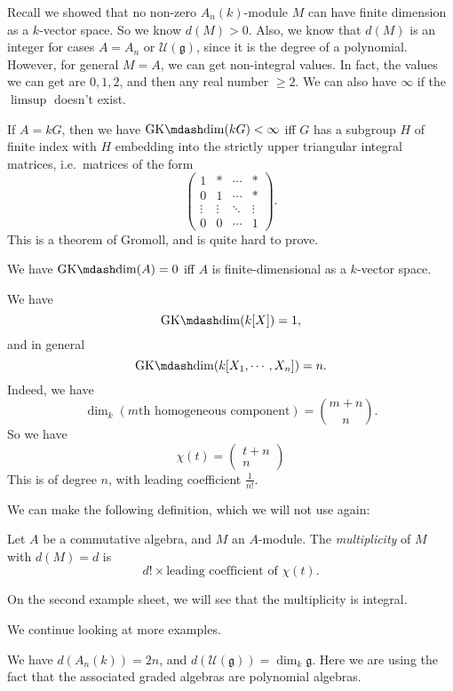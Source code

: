 \documentclass[a4paper]{article}
\newcommand\GKdim{\mathrm{GK}\mdash\mathrm{dim}}
\begin{document}
Recall we showed that no non-zero $A_n(k)$-module $M$ can have finite dimension as a $k$-vector space. So we know $d(M) > 0$. Also, we know that $d(M)$ is an integer for cases $A = A_n$ or $\mathcal{U}(\mathfrak{g})$, since it is the degree of a polynomial. However, for general $M = A$, we can get non-integral values. In fact, the values we can get are $0, 1, 2$, and then any real number $\geq 2$. We can also have $\infty$ if the $\limsup$ doesn't exist.

\begin{eg}
  If $A = kG$, then we have $\GKdim(kG) < \infty$ iff $G$ has a subgroup $H$ of finite index with $H$ embedding into the strictly upper triangular integral matrices, i.e.\ matrices of the form
  \[
    \begin{pmatrix}
      1 & * & \cdots & *\\
      0 & 1 & \cdots & *\\
      \vdots & \vdots & \ddots & \vdots\\
      0 & 0 & \cdots & 1
    \end{pmatrix}.
  \]
  This is a theorem of Gromoll, and is quite hard to prove.
\end{eg}

\begin{eg}
  We have $\GKdim(A)= 0$ iff $A$ is finite-dimensional as a $k$-vector space.

  We have
  \[
    \GKdim(k[X]) = 1,
  \]
  and in general
  \[
    \GKdim(k[X_1, \cdots, X_n]) = n.
  \]
  Indeed, we have
  \[
    \dim_k(\text{$m$th homogeneous component}) = \binom{m + n}{n}.
  \]
  So we have
  \[
    \chi(t) =
    \begin{pmatrix}
      t + n\\n
    \end{pmatrix}
  \]
  This is of degree $n$, with leading coefficient $\frac{1}{n!}$.
\end{eg}

We can make the following definition, which we will not use again:
\begin{defi}[Multiplicity]
  Let $A$ be a commutative algebra, and $M$ an $A$-module. The \emph{multiplicity} of $M$ with $d(M) = d$ is
  \[
    d! \times \text{leading coefficient of $\chi(t)$}.
  \]
\end{defi}
On the second example sheet, we will see that the multiplicity is integral.

We continue looking at more examples.
\begin{eg}
  We have $d(A_n(k)) = 2n$, and $d(\mathcal{U}(\mathfrak{g})) = \dim_k \mathfrak{g}$. Here we are using the fact that the associated graded algebras are polynomial algebras.
\end{eg}
\end{document}
